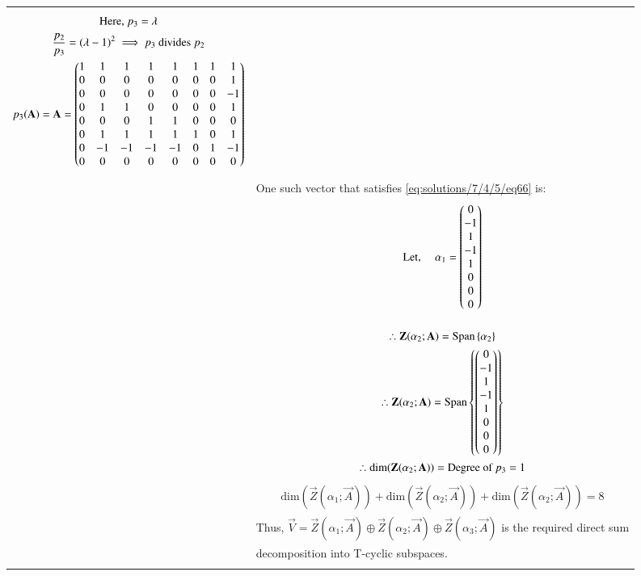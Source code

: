 \begin{longtable}{|p{4cm}|p{14cm}|}
\begin{gather}
        \text{Here, }p_3=\lambda \\
        \frac{p_2}{p_3}=(\lambda-1)^2 \implies p_3 \text{ divides }p_2 \\
        p_3(\mathbf{A})=\mathbf{A}=\begin{pmatrix} 
1 &1  &1  &1  &1  &1  &1  &1 \\ 
 0&0  &0  &0  &0  &0  &0  &1 \\ 
0 &0  &0  &0  &0  &0  &0  &-1 \\ 
0 &1  &1  &0  &0  &0  &0  &1 \\ 
0 &0  &0  &1  &1  &0  &0  &0 \\ 
0 &1  &1  &1  &1  &1  &0  &1 \\ 
0 &-1  &-1  &-1  &-1  &0  &1  &-1 \\ 
0 &0  &0  &0  &0  &0  &0  &0 \end{pmatrix}
        \end{gather}\\
         & One such vector that satisfies \eqref{eq:solutions/7/4/5/eq66} is:
         \begin{gather}
        \text{Let,  } \quad \alpha_1=\begin{pmatrix}0\\-1\\1\\-1\\1\\0\\0\\0\end{pmatrix}
        \end{gather}\\
        &\begin{gather}
        \therefore \mathbf{Z}(\alpha_2;\mathbf{A})=\text{Span}\left\{\alpha_2\right\}\\
         \therefore \mathbf{Z}(\alpha_2;\mathbf{A})=\text{Span}\left\{\begin{pmatrix}0\\-1\\1\\-1\\1\\0\\0\\0\end{pmatrix}\right\}\\
        \therefore \text{dim}(\mathbf{Z}(\alpha_2;\mathbf{A}))= \text{Degree of $p_3$}=1
        \end{gather}
        \begin{gather}
        \text{dim}(\vec{Z}(\alpha_1;\vec{A}))+\text{dim}(\vec{Z}(\alpha_2;\vec{A}))+\text{dim}(\vec{Z}(\alpha_2;\vec{A}))=8
        \end{gather}\\
        & Thus, $\vec{V}=\vec{Z}(\alpha_1;\vec{A})\oplus \vec{Z}(\alpha_2;\vec{A})\oplus \vec{Z}(\alpha_3;\vec{A})$ is the required direct sum \\
        &decomposition into T-cyclic subspaces.\\
\caption{}
\label{eq:solutions/7/4/5/tab}
\end{longtable}
\twocolumn
